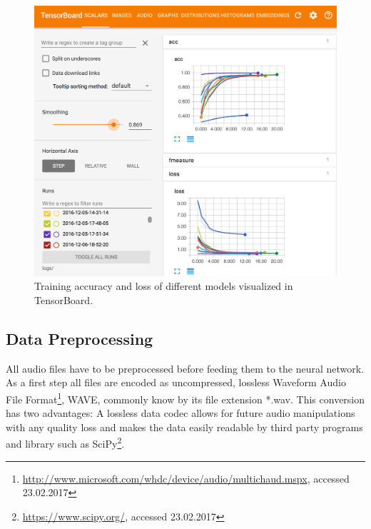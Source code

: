 	\begin{figure}[]
  		\centering
    	\includegraphics[width=\textwidth,keepaspectratio]{img/tensorboard.png}
    	\caption{Training accuracy and loss of different models  visualized in TensorBoard.}
    	\label{fig:tensorboard}
	\end{figure}		
	
\subsection{Data Preprocessing}
\label{sec:data_processing}
All audio files have to be preprocessed before feeding them to the neural network. As a first step all files are encoded as uncompressed, lossless Waveform Audio File Format\footnote{\url{http://www.microsoft.com/whdc/device/audio/multichaud.mspx}, accessed 23.02.2017}, WAVE, commonly know by its file extension *.wav. This conversion has two advantages: A lossless data codec allows for future audio manipulations with any quality loss and makes the data easily readable by third party programs and library such as SciPy\footnote{\url{https://www.scipy.org/}, accessed 23.02.2017}. 

